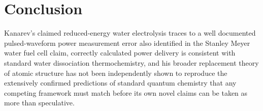 \documentclass[11pt]{article}
\begin{document}
\section{Conclusion}

Kanarev's claimed reduced-energy water electrolysis traces to a well documented pulsed-waveform power measurement error also identified in the Stanley Meyer water fuel cell claim, correctly calculated power delivery is consistent with standard water dissociation thermochemistry, and his broader replacement theory of atomic structure has not been independently shown to reproduce the extensively confirmed predictions of standard quantum chemistry that any competing framework must match before its own novel claims can be taken as more than speculative.
\end{document}
